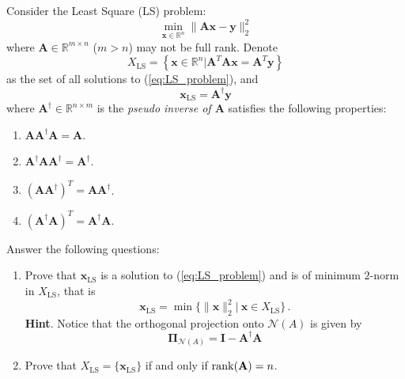 \documentclass[english,onecolumn]{IEEEtran}
\begin{document}
Consider the Least Square (LS) problem:
\begin{equation}
    \label{eq:LS_problem}
    \min_{\mathbf{x}\in\mathbb{R}^n}\|\mathbf{A}\mathbf{x}-\mathbf{y}\|_2^2
\end{equation}
where $\mathbf{A}\in\mathbb{R}^{m\times n}$ ($m>n$) may not be full rank. Denote 
\begin{equation*}
    X_{\mathrm{LS}}=\left\{\mathbf{x}\in\mathbb{R}^n| \mathbf{A}^T\mathbf{A}\mathbf{x}=\mathbf{A}^T\mathbf{y}\right\}
\end{equation*}
as the set of all solutions to (\ref{eq:LS_problem}), and 
\begin{equation*}
    \mathbf{x}_{\mathrm{LS}}=\mathbf{A}^\dagger \mathbf{y}
\end{equation*}
where $\mathbf{A}^\dagger\in\mathbb{R}^{n\times m}$ is the \emph{pseudo inverse of $\mathbf{A}$} satisfies the following properties:
\begin{enumerate}
    \item $\mathbf{A}\mathbf{A}^\dagger\mathbf{A}=\mathbf{A}$.
    \item $\mathbf{A}^\dagger\mathbf{A}\mathbf{A}^\dagger=\mathbf{A}^\dagger$.
    \item $(\mathbf{A}\mathbf{A}^\dagger)^T=\mathbf{A}\mathbf{A}^\dagger$.
    \item $(\mathbf{A}^\dagger\mathbf{A})^T=\mathbf{A}^\dagger\mathbf{A}$.
\end{enumerate}

Answer the following questions:
\begin{enumerate}
    \item Prove that $\mathbf{x}_{\mathrm{LS}}$ is a solution to (\ref{eq:LS_problem}) and is of minimum $2$-norm in $X_{\mathrm{LS}}$, that is
    \begin{equation*}
        \mathbf{x}_{\mathrm{LS}}=\min\{\|\mathbf{x}\|_2^2|\  \mathbf{x}\in X_{\mathrm{LS}}\}\,.
    \end{equation*}
    \textbf{Hint}. Notice that the orthogonal projection onto $\mathcal{N}(A)$ is given by
    \begin{equation*}
        \mathbf{\Pi}_{\mathcal{N}(A)}=\mathbf{I}-\mathbf{A}^\dagger\mathbf{A}
    \end{equation*}
    
    \item Prove that $X_{\mathrm{LS}}=\{\mathbf{x}_{\mathrm{LS}}\}$ if and only if $\mathrm{rank}({\bf A})=n$.
\end{enumerate}
\end{document}
